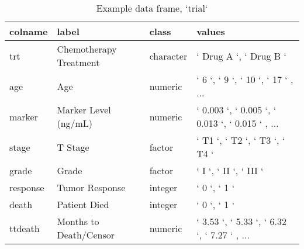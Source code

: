 \begin{table}

\caption{\label{tab:unnamed-chunk-1}Example data frame, `trial`}
\centering
\begin{tabular}[t]{l|l|l|l}
\hline
colname & label & class & values\\
\hline
trt & Chemotherapy Treatment & character & ` Drug A `, ` Drug B `\\
\hline
age & Age & numeric & ` 6 `, ` 9 `, ` 10 `, ` 17 ` , ...\\
\hline
marker & Marker Level (ng/mL) & numeric & ` 0.003 `, ` 0.005 `, ` 0.013 `, ` 0.015 ` , ...\\
\hline
stage & T Stage & factor & ` T1 `, ` T2 `, ` T3 `, ` T4 `\\
\hline
grade & Grade & factor & ` I `, ` II `, ` III `\\
\hline
response & Tumor Response & integer & ` 0 `, ` 1 `\\
\hline
death & Patient Died & integer & ` 0 `, ` 1 `\\
\hline
ttdeath & Months to Death/Censor & numeric & ` 3.53 `, ` 5.33 `, ` 6.32 `, ` 7.27 ` , ...\\
\hline
\end{tabular}
\end{table}
